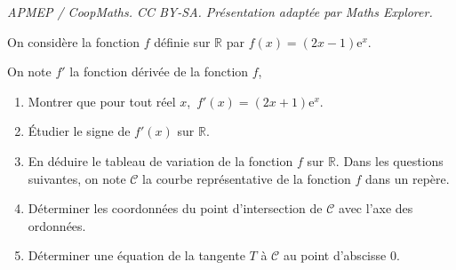 \documentclass[10pt]{article}
\providecommand{\R}{\mathbb{R}}
\begin{document}
\noindent\textit{APMEP / CoopMaths. CC BY-SA. Présentation adaptée par Maths Explorer.}\par\medskip
\medskip

On considère la fonction $f$ définie sur $\R$ par $f(x) = \left (2x - 1\right )\text{e}^x$.

On note $f'$ la fonction dérivée de la fonction $f$,

\medskip

\begin{enumerate}
\item Montrer que pour tout réel $x$,\, $f'(x) = \left (2x + 1\right )\text{e}^x$.
\item Étudier le signe de $f'(x)$ sur $\R$.
\item En déduire le tableau de variation de la fonction $f$ sur $\R$. Dans les questions suivantes, on note $\mathcal C$ la courbe représentative de la fonction $f$ dans un repère.
\item Déterminer les coordonnées du point d'intersection de $\mathcal C$ avec l'axe des ordonnées. 
\item Déterminer une équation de la tangente $T$ à $\mathcal C$ au point d'abscisse $0$.
\end{enumerate}

\bigskip
\end{document}
